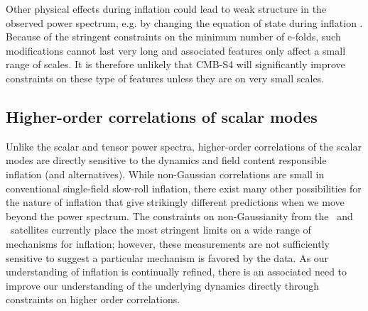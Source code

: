 
Other physical effects during inflation could lead to weak structure in the observed power spectrum, e.g. by changing the equation of state during inflation \cite{Achucarro:2014msa}. Because of the stringent constraints on the minimum number of e-folds, such modifications cannot last very long and associated features only affect a small range of scales. It is therefore unlikely that CMB-S4 will significantly improve constraints on these type of features unless they are on very small scales. 



\subsection{Higher-order correlations of scalar modes}
\label{subsec:scalarNG}

Unlike the scalar and tensor power spectra, higher-order correlations of the scalar modes are directly sensitive to the dynamics and field content responsible inflation (and alternatives).  While non-Gaussian correlations are small in conventional single-field slow-roll inflation, there exist many other possibilities for the nature of inflation that give strikingly different predictions when we move beyond the power spectrum.  The constraints on non-Gaussianity from the \wmap\ and \planck\ satellites currently place the most stringent limits on a wide range of mechanisms for inflation; however, these measurements are not sufficiently sensitive to suggest a particular mechanism is favored by the data.  As our understanding of inflation is continually refined, there is an associated need to improve our understanding of the underlying dynamics directly through constraints on higher order correlations.  

